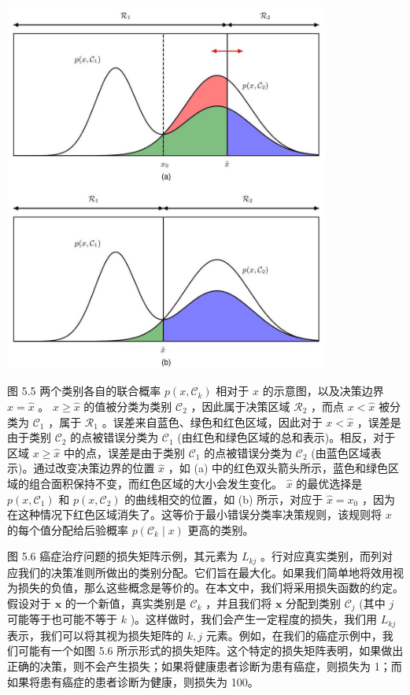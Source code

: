 \documentclass[10pt]{report}
\begin{document}
\begin{center}
\includegraphics[max width=0.8\textwidth]{images/0194e279-9b28-703a-88f4-c3ac21e2010d_160_342_347_1110_1268_0.jpg}
\end{center}
\hspace*{3em} 

图 5.5 两个类别各自的联合概率 \(p\left( {x,{\mathcal{C}}_{k}}\right)\) 相对于 \(x\) 的示意图，以及决策边界 \(x = \widehat{x}\) 。 \(x \geq  \widehat{x}\) 的值被分类为类别 \({\mathcal{C}}_{2}\) ，因此属于决策区域 \({\mathcal{R}}_{2}\) ，而点 \(x < \widehat{x}\) 被分类为 \({\mathcal{C}}_{1}\) ，属于 \({\mathcal{R}}_{1}\) 。误差来自蓝色、绿色和红色区域，因此对于 \(x < \widehat{x}\) ，误差是由于类别 \({\mathcal{C}}_{2}\) 的点被错误分类为 \({\mathcal{C}}_{1}\) (由红色和绿色区域的总和表示)。相反，对于区域 \(x \geq  \widehat{x}\) 中的点，误差是由于类别 \({\mathcal{C}}_{1}\) 的点被错误分类为 \({\mathcal{C}}_{2}\) (由蓝色区域表示)。通过改变决策边界的位置 \(\widehat{x}\) ，如 (a) 中的红色双头箭头所示，蓝色和绿色区域的组合面积保持不变，而红色区域的大小会发生变化。 \(\widehat{x}\) 的最优选择是 \(p\left( {x,{\mathcal{C}}_{1}}\right)\) 和 \(p\left( {x,{\mathcal{C}}_{2}}\right)\) 的曲线相交的位置，如 (b) 所示，对应于 \(\widehat{x} = {x}_{0}\) ，因为在这种情况下红色区域消失了。这等价于最小错误分类率决策规则，该规则将 \(x\) 的每个值分配给后验概率 \(p\left( {{\mathcal{C}}_{k} \mid  x}\right)\) 更高的类别。

图 5.6 癌症治疗问题的损失矩阵示例，其元素为 \({L}_{kj}\) 。行对应真实类别，而列对应我们的决策准则所做出的类别分配。它们旨在最大化。如果我们简单地将效用视为损失的负值，那么这些概念是等价的。在本文中，我们将采用损失函数的约定。假设对于 \(\mathbf{x}\) 的一个新值，真实类别是 \({\mathcal{C}}_{k}\) ，并且我们将 \(\mathbf{x}\) 分配到类别 \({\mathcal{C}}_{j}\) (其中 \(j\) 可能等于也可能不等于 \(k\) )。这样做时，我们会产生一定程度的损失，我们用 \({L}_{kj}\) 表示，我们可以将其视为损失矩阵的 \(k,j\) 元素。例如，在我们的癌症示例中，我们可能有一个如图 5.6 所示形式的损失矩阵。这个特定的损失矩阵表明，如果做出正确的决策，则不会产生损失；如果将健康患者诊断为患有癌症，则损失为 1；而如果将患有癌症的患者诊断为健康，则损失为 100。
\end{document}
